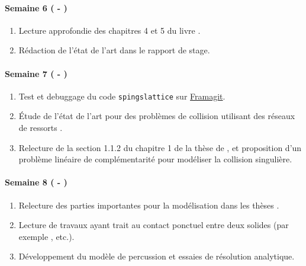\paragraph{Semaine 6 ( - )} 
\begin{enumerate}
    \item Lecture approfondie des chapitres 4 et 5 du livre \parencite{balasoiu2020halthesis}.
    \item Rédaction de l'\/état de l'\/art dans le rapport de stage. 
\end{enumerate}
  

\paragraph{Semaine 7 ( - )} 

\begin{enumerate}
    \item Test et debuggage du code \verb|spingslattice| sur \href{https://framagit.org/RaK/SimuRessorts}{Framagit}. 
    \item Étude de l'état de l'art pour des problèmes de collision utilisant des réseaux de ressorts \parencite{islam2020numerical,gerivani2019proposing,homodeling,manea2021simplified}.
    \item Relecture de la section 1.1.2 du chapitre 1 de la thèse de \citeauthor{rabatel2015thesis} \parencite[p.18]{rabatel2015thesis}, et proposition d'un problème linéaire de complémentarité pour modéliser la collision singulière.
  \end{enumerate}


\paragraph{Semaine 8 ( - )} 
\begin{enumerate}
    \item Relecture des parties importantes pour la modélisation dans les thèses \parencite{balasoiu2020halthesis,rabatel2015thesis}.
    \item Lecture de travaux ayant trait au contact ponctuel entre deux solides (par exemple \parencite{lotstedt1981coulomb}, etc.).
    \item Développement du modèle de percussion et essaies de résolution analytique. 
\end{enumerate}
  

